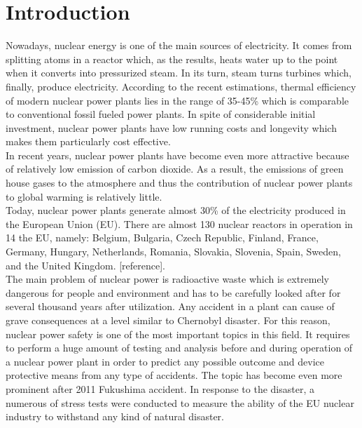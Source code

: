 \chapter{Introduction}\label{chapter:introduction}

Nowadays, nuclear energy is one of the main sources of electricity. It comes from splitting atoms in a reactor which, as the results, heats water up to the point when it converts into pressurized steam. In its turn, steam turns turbines which, finally, produce electricity. According to the recent estimations, thermal efficiency of modern nuclear power plants lies in the range of 35-45\% which is comparable to conventional fossil fueled power plants. In spite of considerable initial investment,  nuclear power plants have low running costs and longevity which makes them particularly cost effective.\\


In recent years, nuclear power plants have become even more attractive because of relatively low emission of carbon dioxide. As a result, the emissions of green house gases to the atmosphere and thus the contribution of nuclear power plants to global warming is relatively little.\\


Today, nuclear power plants generate almost 30\% of the electricity produced in the European Union (EU). There are almost 130 nuclear reactors in operation in 14 the EU, namely: Belgium, Bulgaria, Czech Republic, Finland, France, Germany, Hungary, Netherlands, Romania, Slovakia, Slovenia, Spain, Sweden, and the United Kingdom. [reference].\\


The main problem of nuclear power is radioactive waste which is extremely dangerous for people and environment and has to be carefully looked after for several thousand years after utilization. Any accident in a plant can cause of grave consequences at a level similar to Chernobyl disaster. For this reason, nuclear power safety is one of the most important topics in this field. It requires to perform a huge amount of testing and analysis before and during operation of a nuclear power plant in order to predict any possible outcome and device protective means from any type of accidents. The topic has become even more prominent after 2011 Fukushima accident. In response to the disaster, a numerous of stress tests were conducted to measure the ability of the EU nuclear industry to withstand any kind of natural disaster.\\



